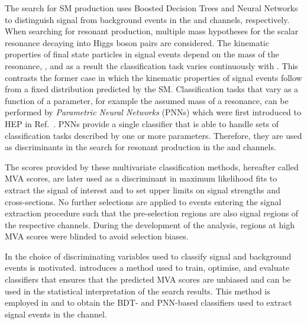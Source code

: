 The search for SM \HH production uses Boosted Decision Trees and
Neural Networks to distinguish signal from background events in the
\hadhad and \lephad channels, respectively. When searching for
resonant \HH production, multiple mass hypotheses for the scalar
resonance decaying into Higgs boson pairs are considered. The
kinematic properties of final state particles in signal events depend
on the mass of the resonance, \mX, and as a result the classification
task varies continuously with \mX. This contrasts the former case in
which the kinematic properties of signal events follow from a fixed
distribution predicted by the SM. Classification tasks that vary as a
function of a parameter, for example the assumed mass of a resonance,
can be performed by \emph{Parametric Neural Networks} (PNNs) which
were first introduced to HEP in Ref.~\cite{Baldi:2016fzo}. PNNs
provide a single classifier that is able to handle sets of
classification tasks described by one or more parameters. Therefore,
they are used as discriminants in the search for resonant \HH
production in the \hadhad and \lephad channels.

The scores provided by these multivariate classification methods,
hereafter called MVA scores, are later used as a discriminant in
maximum likelihood fits to extract the signal of interest and to set
upper limits on signal strengths and cross-sections. No further
selections are applied to events entering the signal extraction
procedure such that the pre-selection regions are also signal regions
of the respective channels. During the development of the analysis,
regions at high MVA scores were blinded to avoid selection biases.

In  the choice of
discriminating variables used to classify signal and background events
is motivated.  introduces a method used
to train, optimise, and evaluate classifiers that ensures that the
predicted MVA scores are unbiased and can be used in the statistical
interpretation of the search results. This method is employed in
 and  to obtain the BDT- and
PNN-based classifiers used to extract signal events in the \hadhad
channel.



